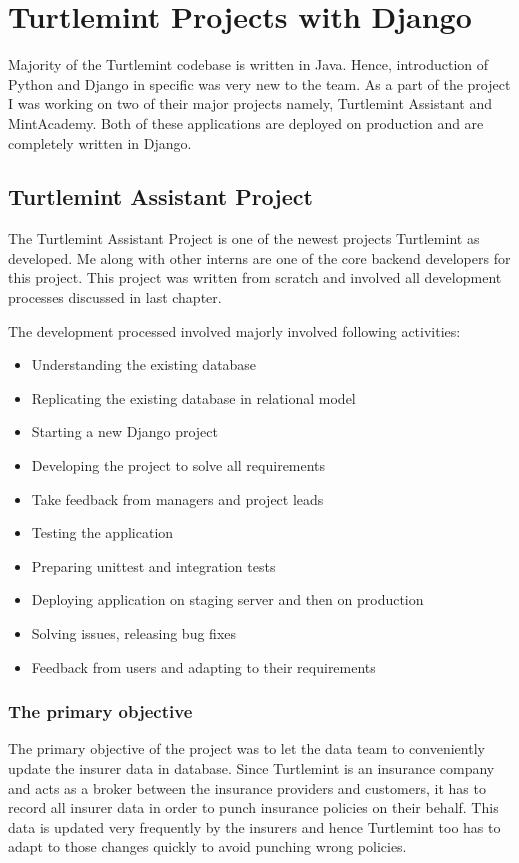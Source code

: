 \chapter{Turtlemint Projects with Django}

Majority of the Turtlemint codebase is written in Java. Hence, introduction
of Python and Django in specific was very new to the team. As a part of the
project I was working on two of their major projects namely, Turtlemint
Assistant and MintAcademy. Both of these applications are deployed on
production and are completely written in Django.

\section{Turtlemint Assistant Project}
The Turtlemint Assistant Project is one of the newest projects Turtlemint as
developed. Me along with other interns are one of the core backend developers
for this project. This project was written from scratch and involved all
development processes discussed in last chapter.

The development processed involved majorly involved following activities:

\begin{itemize}
    \item Understanding the existing database
    \item Replicating the existing database in relational model
    \item Starting a new Django project
    \item Developing the project to solve all requirements
    \item Take feedback from managers and project leads
    \item Testing the application
    \item Preparing unittest and integration tests
    \item Deploying application on staging server and then on production
    \item Solving issues, releasing bug fixes
    \item Feedback from users and adapting to their requirements
\end{itemize}

\subsection{The primary objective}
The primary objective of the project was to let the data team to conveniently
update the insurer data in database. Since Turtlemint is an insurance company
and acts as a broker between the insurance providers and customers, it has to
record all insurer data in order to punch insurance policies on their behalf.
This data is updated very frequently by the insurers and hence Turtlemint too
has to adapt to those changes quickly to avoid punching wrong policies.

